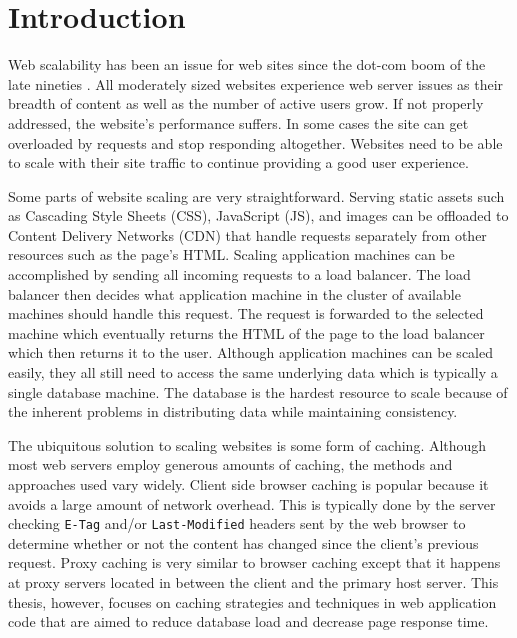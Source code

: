 \documentclass[12pt]{ucthesis}
\begin{document}
\pagestyle{plain}




\renewcommand{\baselinestretch}{1.66}


\chapter{Introduction} \label{introduction}
Web scalability has been an issue for web sites since the dot-com boom of the late nineties \cite{webServerScaling}.
All moderately sized websites experience web server issues as their breadth of content as well as the number of active users grow.
If not properly addressed, the website's performance suffers.
In some cases the site can get overloaded by requests and stop responding altogether.
Websites need to be able to scale with their site traffic to continue providing a good user experience.

Some parts of website scaling are very straightforward.
Serving static assets such as Cascading Style Sheets (CSS), JavaScript (JS), and images can be offloaded to Content Delivery Networks (CDN) that handle requests separately from other resources such as the page's HTML.
Scaling application machines can be accomplished by sending all incoming requests to a load balancer.
The load balancer then decides what application machine in the cluster of available machines should handle this request.
The request is forwarded to the selected machine which eventually returns the HTML of the page to the load balancer which then returns it to the user.
Although application machines can be scaled easily, they all still need to access the same underlying data which is typically a single database machine.
The database is the hardest resource to scale because of the inherent problems in distributing data while maintaining consistency.

The ubiquitous solution to scaling websites is some form of caching.
Although most web servers employ generous amounts of caching, the methods and approaches used vary widely.
Client side browser caching is popular because it avoids a large amount of network overhead.
This is typically done by the server checking {\tt E-Tag} and/or {\tt Last-Modified} headers sent by the web browser to determine whether or not the content has changed since the client's previous request.
Proxy caching is very similar to browser caching except that it happens at proxy servers located in between the client and the primary host server.
This thesis, however, focuses on caching strategies and techniques in web application code that are aimed to reduce database load and decrease page response time.
\end{document}
